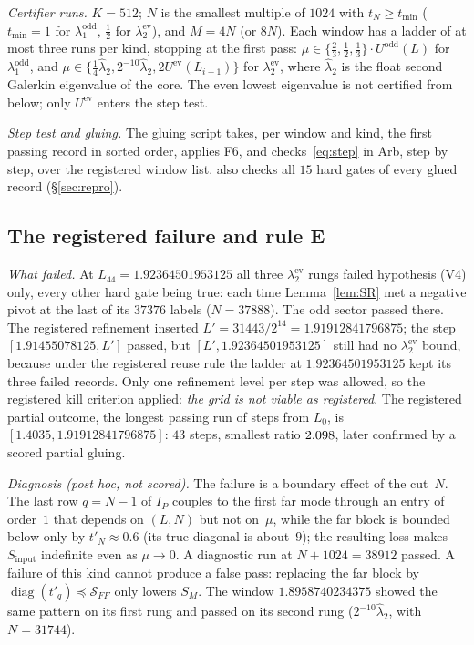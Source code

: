 \documentclass[11pt]{amsart}
\newcommand{\ev}{\mathrm{ev}}
\newcommand{\od}{\mathrm{odd}}
\newcommand{\file}[1]{{\small\path{#1}}}
\theoremstyle{definition}
\theoremstyle{remark}
\numberwithin{equation}{section}
\begin{document}
\emph{Certifier runs.} $K=512$; $N$ is the smallest multiple of $1024$ with $t_N\ge t_{\min}$ ($t_{\min}=1$ for $\lambda_1^\od$, $\tfrac12$ for $\lambda_2^\ev$), and $M=4N$ (or $8N$). Each window has a ladder of at most three runs per kind, stopping at the first pass: $\mu\in\{\tfrac23,\tfrac12,\tfrac13\}\cdot U^\od(L)$ for $\lambda_1^\od$, and $\mu\in\{\tfrac14\hat\lambda_2,2^{-10}\hat\lambda_2,2U^\ev(L_{i-1})\}$ for $\lambda_2^\ev$, where $\hat\lambda_2$ is the float second Galerkin eigenvalue of the core. The even lowest eigenvalue is not certified from below; only $U^\ev$ enters the step test.

\emph{Step test and gluing.} The gluing script takes, per window and kind, the first passing record in sorted order, applies F6, and checks~\eqref{eq:step} in Arb, step by step, over the registered window list. \file{check_theorem.sh} also checks all $15$ hard gates of every glued record (\S\ref{sec:repro}).

\subsection{The registered failure and rule E}\label{sec:piece4fail}
\emph{What failed.} At $L_{44}=1.92364501953125$ all three $\lambda_2^\ev$ rungs failed hypothesis (V4) only, every other hard gate being true: each time Lemma~\ref{lem:SR} met a negative pivot at the last of its $37376$ labels ($N=37888$). The odd sector passed there. The registered refinement inserted $L'=31443/2^{14}=1.91912841796875$; the step $[1.91455078125,L']$ passed, but $[L',1.92364501953125]$ still had no $\lambda_2^\ev$ bound, because under the registered reuse rule the ladder at $1.92364501953125$ kept its three failed records. Only one refinement level per step was allowed, so the registered kill criterion applied: \emph{the grid is not viable as registered}. The registered partial outcome, the longest passing run of steps from $L_0$, is $[1.4035,1.91912841796875]$: $43$ steps, smallest ratio $2.098$, later confirmed by a scored partial gluing.

\emph{Diagnosis (post hoc, not scored).} The failure is a boundary effect of the cut~$N$. The last row $q=N-1$ of $I_P$ couples to the first far mode through an entry of order~$1$ that depends on $(L,N)$ but not on~$\mu$, while the far block is bounded below only by $t'_N\approx0.6$ (its true diagonal is about~$9$); the resulting loss makes $S_{\mathrm{input}}$ indefinite even as $\mu\to0$. A diagnostic run at $N+1024=38912$ passed. A failure of this kind cannot produce a false pass: replacing the far block by $\operatorname{diag}(t'_q)\preceq\mathcal S_{FF}$ only lowers $S_M$. The window $1.8958740234375$ showed the same pattern on its first rung and passed on its second rung ($2^{-10}\hat\lambda_2$, with $N=31744$).
\end{document}
